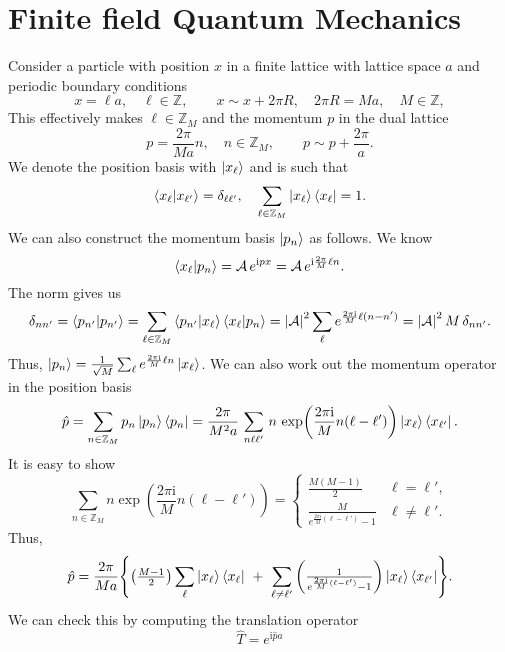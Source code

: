 \documentclass[10pt, a4paper]{article}
\newcommand{\ii}{\mathrm{i}}
\numberwithin{equation}{section}
\begin{document}
\section{Finite field Quantum Mechanics}
Consider a particle with position $x$ in a finite lattice with lattice space $a$ and periodic boundary conditions
\begin{equation}
  x = \ell a, \quad \ell \in \mathbb{Z}, \qquad x \sim x + 2 \pi R, \quad 2\pi R = M a, \quad M \in \mathbb{Z},
\end{equation}
This effectively makes $\ell \in \mathbb{Z}_M$ and the momentum $p$ in the dual lattice
\begin{equation}
  p = \frac{2 \pi}{M a} n, \quad n \in \mathbb{Z}_M, \qquad p \sim p + \frac{2 \pi}{a}.
\end{equation}
We denote the position basis with $\ket{x_\ell}$ and is such that
\begin{equation}
  \bra{x_\ell}\ket{x_{\ell'}} = \delta_{\ell \ell'}, \quad \sum_{\ell \in \mathbb{Z}_M} \ket{x_\ell}\bra{x_\ell} = 1.
\end{equation}
We can also construct the momentum basis $\ket{p_n}$ as follows. We know
\begin{equation}
  \bra{x_\ell}\ket{p_n} = \mathcal{A} \, e^{\ii p x} = \mathcal{A} \, e^{\ii \frac{2 \pi}{M} \ell n}.
\end{equation}
The norm gives us
\begin{equation}
  \delta_{n n'} = \bra{p_{n'}} \ket{p_{n'}} = \sum_{\ell \in \mathbb{Z}_M} \bra{p_{n'}}\ket{x_\ell} \bra{x_\ell}\ket{p_n} = \abs{\mathcal{A}}^2 \sum_{\ell} e^{\frac{2\pi \ii}{M} \ell (n - n')} = \abs{\mathcal{A}}^2 \, M \, \delta_{n n'}.
\end{equation}
Thus, $\ket{p_n} = \frac{1}{\sqrt{M}} \sum_{\ell} e^{\frac{2\pi\ii}{M} \ell n} \ket{x_\ell}$. We can also work out the momentum operator in the position basis
\begin{equation}
  \hat{p} = \sum_{n \in \mathbb{Z}_M} p_n \ket{p_n} \bra{p_n} = \frac{2 \pi}{M^2 a} \, \sum_{n \ell \ell'} \, n  \, \exp(\frac{2 \pi \ii}{M} n (\ell - \ell')) \ket{x_\ell} \bra{x_{\ell'}}.
\end{equation}
It is easy to show
\begin{equation}
  \sum_{n \in \mathbb{Z}_M} n \exp(\frac{2 \pi \ii}{M} n (\ell - \ell')) = \begin{cases}
    \frac{M (M-1)}{2} & \ell = \ell', \\
    \frac{M}{e^{\frac{2\pi\ii}{M} (\ell - \ell')} - 1} & \ell \neq \ell'.
  \end{cases}
\end{equation}
Thus,
\begin{equation}
  \hat{p} = \frac{2 \pi}{M a} \Biggl\{ \qty(\tfrac{M-1}{2}) \sum_{\ell} \ket{x_\ell} \bra{x_\ell} \ + \ \sum_{\ell \neq \ell'} \qty(\tfrac{1}{e^{\frac{2\pi\ii}{M} (\ell - \ell')} - 1}) \ket{x_\ell} \bra{x_{\ell'}} \Biggr\}.
\end{equation}
We can check this by computing the translation operator
\begin{equation}
  \hat{T} = e^{\ii \hat{p} a}
\end{equation}


\printbibliography
\end{document}
